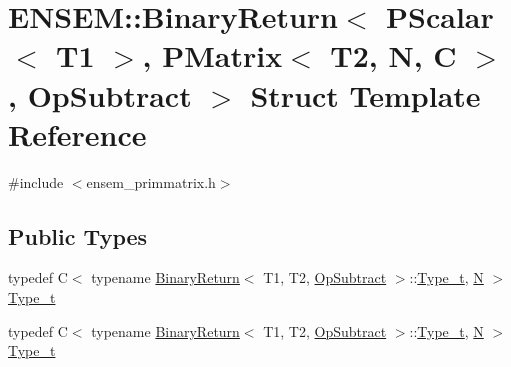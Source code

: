 \hypertarget{structENSEM_1_1BinaryReturn_3_01PScalar_3_01T1_01_4_00_01PMatrix_3_01T2_00_01N_00_01C_01_4_00_01OpSubtract_01_4}{}\section{E\+N\+S\+EM\+:\+:Binary\+Return$<$ P\+Scalar$<$ T1 $>$, P\+Matrix$<$ T2, N, C $>$, Op\+Subtract $>$ Struct Template Reference}
\label{structENSEM_1_1BinaryReturn_3_01PScalar_3_01T1_01_4_00_01PMatrix_3_01T2_00_01N_00_01C_01_4_00_01OpSubtract_01_4}


{\ttfamily \#include $<$ensem\+\_\+primmatrix.\+h$>$}

\subsection*{Public Types}
\begin{DoxyCompactItemize}
\item 
typedef C$<$ typename \mbox{\hyperlink{structENSEM_1_1BinaryReturn}{Binary\+Return}}$<$ T1, T2, \mbox{\hyperlink{structENSEM_1_1OpSubtract}{Op\+Subtract}} $>$\+::\mbox{\hyperlink{structENSEM_1_1BinaryReturn_3_01PScalar_3_01T1_01_4_00_01PMatrix_3_01T2_00_01N_00_01C_01_4_00_01OpSubtract_01_4_a34bfaa23545607c65ea30b34a94971f1}{Type\+\_\+t}}, \mbox{\hyperlink{operator__name__util_8cc_a7722c8ecbb62d99aee7ce68b1752f337}{N}} $>$ \mbox{\hyperlink{structENSEM_1_1BinaryReturn_3_01PScalar_3_01T1_01_4_00_01PMatrix_3_01T2_00_01N_00_01C_01_4_00_01OpSubtract_01_4_a34bfaa23545607c65ea30b34a94971f1}{Type\+\_\+t}}
\item 
typedef C$<$ typename \mbox{\hyperlink{structENSEM_1_1BinaryReturn}{Binary\+Return}}$<$ T1, T2, \mbox{\hyperlink{structENSEM_1_1OpSubtract}{Op\+Subtract}} $>$\+::\mbox{\hyperlink{structENSEM_1_1BinaryReturn_3_01PScalar_3_01T1_01_4_00_01PMatrix_3_01T2_00_01N_00_01C_01_4_00_01OpSubtract_01_4_a34bfaa23545607c65ea30b34a94971f1}{Type\+\_\+t}}, \mbox{\hyperlink{operator__name__util_8cc_a7722c8ecbb62d99aee7ce68b1752f337}{N}} $>$ \mbox{\hyperlink{structENSEM_1_1BinaryReturn_3_01PScalar_3_01T1_01_4_00_01PMatrix_3_01T2_00_01N_00_01C_01_4_00_01OpSubtract_01_4_a34bfaa23545607c65ea30b34a94971f1}{Type\+\_\+t}}
\end{DoxyCompactItemize}


